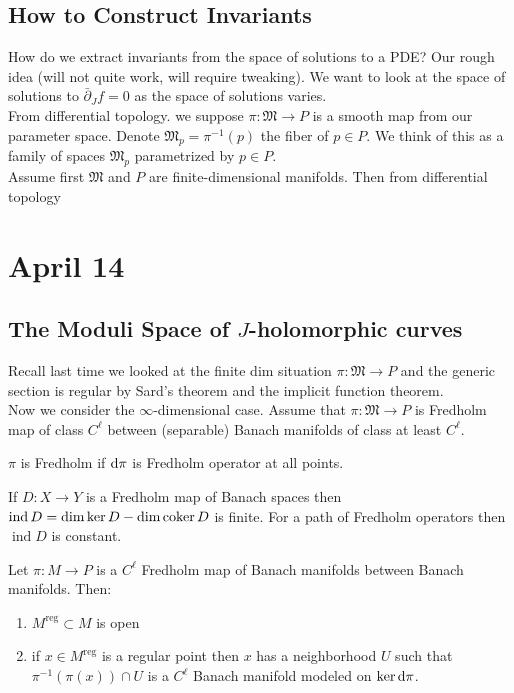 \documentclass[12pt]{article}
\newcommand{\dbar}{\bar{\partial}}
\DeclareMathOperator{\ind}{\mathrm{ind}}
\begin{document}
\subsection{How to Construct Invariants}

\newcommand{\mf}[1]{\mathfrak{#1}}

How do we extract invariants from the space of solutions to a PDE? Our rough idea (will not quite work, will require tweaking). We want to look at the space of solutions to $\dbar_J f = 0$ as the space of solutions varies.
\bigskip\\
From differential topology. we suppose $\pi : \mf{M} \to P$ is a smooth map from our parameter space. Denote $\mf{M}_p = \pi^{-1}(p)$ the fiber of $p \in P$. We think of this as a family of spaces $\mf{M}_p$ parametrized by $p \in P$. 
\bigskip\\
Assume first $\mf{M}$ and $P$ are finite-dimensional manifolds. Then from differential topology  

\section{April 14}

\subsection{The Moduli Space of $J$-holomorphic curves}

Recall last time we looked at the finite dim situation $\pi : \mf{M} \to P$ and the generic section is regular by Sard's theorem and the implicit function theorem. 
\bigskip\\
Now we consider the $\infty$-dimensional case. Assume that $\pi : \mf{M} \to P$ is Fredholm map of class $C^\ell$ between (separable) Banach manifolds of class at least $C^\ell$.

\begin{defn}
$\pi$ is Fredholm if $\mathrm{d}{\pi}$ is Fredholm operator at all points. 
\end{defn}

\newcommand{\reg}{\mathrm{reg}}

\begin{rmk}
If $D : X \to Y$ is a Fredholm map of Banach spaces then $\ind{D} = \dim{\ker{D}} - \dim{\coker{D}}$ is finite. For a path of Fredholm operators then $\ind{D}$ is constant. 
\end{rmk}

\begin{thm}
Let $\pi : M \to P$ is a $C^\ell$ Fredholm map of Banach manifolds between Banach manifolds. Then:
\begin{enumerate}
\item $M^{\reg} \subset M$ is open
\item if $x \in M^{\reg}$ is a regular point then $x$ has a neighborhood $U$ such that $\pi^{-1}(\pi(x)) \cap U$ is a $C^\ell$ Banach manifold modeled on $\ker{\mathrm{d}{\pi}}$. 
\end{enumerate}
\end{thm}
\end{document}

